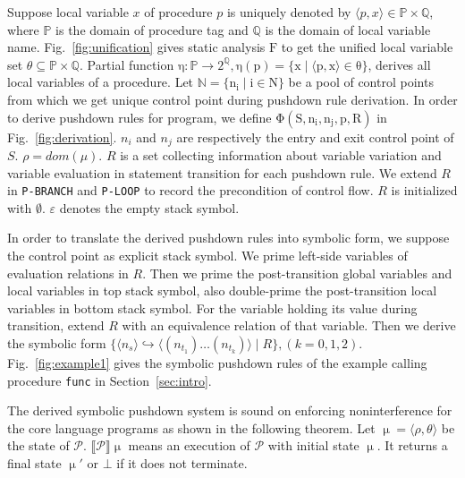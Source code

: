 \documentclass{llncs}
\begin{document}
Suppose local variable $x$ of procedure $p$ is uniquely denoted by
$\langle p,x\rangle \in \mathbb{P}\times \mathbb{Q}$, where
$\mathbb{P}$ is the domain of procedure tag and $\mathbb{Q}$ is the
domain of local variable name. Fig.~\ref{fig:unification} gives
static analysis $\mathrm{F}$ to get the unified local variable set
$\theta\subseteq \mathbb{P}\times \mathbb{Q}$. Partial function
$\mathrm{\eta: \mathbb{P}\rightarrow 2^{\mathbb{Q}},\eta(p)=\{x\mid
\langle p,x\rangle \in \theta\}}$, derives all local variables of a
procedure. Let $\mathrm{\mathbb{N}=\{n_i\mid i\in N\}}$ be a pool of
control points from which we get unique control point during
pushdown rule derivation. In order to derive pushdown rules for
program, we define $\mathrm{\Phi(S,n_i,n_j,p,R)}$ in
Fig.~\ref{fig:derivation}. $n_i$ and $n_j$ are respectively the
entry and exit control point of $S$. $\rho=dom(\mu)$. $R$ is a set
collecting information about variable variation and variable
evaluation in statement transition for each pushdown rule. We extend
$R$ in \texttt{P-BRANCH} and \texttt{P-LOOP} to record the
precondition of control flow. $R$ is initialized with $\emptyset$.
$\varepsilon$ denotes the empty stack symbol.

In order to translate the derived pushdown rules into symbolic form,
we suppose the control point as explicit stack symbol. We prime
left-side variables of evaluation relations in $R$. Then we prime
the post-transition global variables and local variables in top
stack symbol, also double-prime the post-transition local variables
in bottom stack symbol. For the variable holding its value during
transition, extend $R$ with an equivalence relation of that
variable. Then we derive the symbolic form $\{\langle n_s\rangle
\hookrightarrow \langle (n_{t_1})\ldots (n_{t_k})\rangle \mid R\},
(k=0,1,2)$. Fig.~\ref{fig:example1} gives the symbolic pushdown
rules of the example calling procedure \texttt{func} in
Section~\ref{sec:intro}.

The derived symbolic pushdown system is sound on enforcing
noninterference for the core language programs as shown in the
following theorem. Let $\upmu=\langle \rho,\theta\rangle$ be the
state of $\mathcal {P}$. $\llbracket \mathcal {P}\rrbracket \upmu$
means an execution of $\mathcal {P}$ with initial state $\upmu$. It
returns a final state $\upmu'$ or $\bot$ if it does not terminate.
\end{document}
